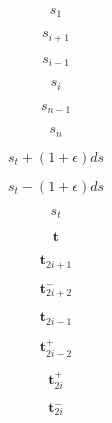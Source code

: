 \documentclass[a4paper,10pt,fleqn]{book}
\newcommand{\vect}[1]{\boldsymbol{#1}}
\begin{document}
\begin{equation}
s_{1}
\end{equation}


\begin{equation}
s_{i+1}
\end{equation}


\begin{equation}
s_{i-1}
\end{equation}


\begin{equation}
s_{i}
\end{equation}


\begin{equation}
s_{n-1}
\end{equation}


\begin{equation}
s_{n}
\end{equation}


\begin{equation}
s_t + (1+\epsilon)ds
\end{equation}


\begin{equation}
s_t - (1+\epsilon)ds
\end{equation}


\begin{equation}
s_t
\end{equation}


\begin{equation}
\vect{t}
\end{equation}


\begin{equation}
\vect{t}_{2i+1}
\end{equation}


\begin{equation}
\vect{t}_{2i+2}^-
\end{equation}


\begin{equation}
\vect{t}_{2i-1}
\end{equation}


\begin{equation}
\vect{t}_{2i-2}^+
\end{equation}


\begin{equation}
\vect{t}_{2i}^+
\end{equation}


\begin{equation}
\vect{t}_{2i}^-
\end{equation}
\end{document}
